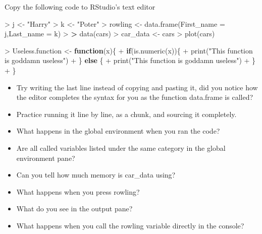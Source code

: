 \documentclass[
]{book}
\newenvironment{Shaded}{\begin{snugshade}}{\end{snugshade}}
\newcommand{\AttributeTok}[1]{\textcolor[rgb]{0.77,0.63,0.00}{#1}}
\newcommand{\ControlFlowTok}[1]{\textcolor[rgb]{0.13,0.29,0.53}{\textbf{#1}}}
\newcommand{\ErrorTok}[1]{\textcolor[rgb]{0.64,0.00,0.00}{\textbf{#1}}}
\newcommand{\FunctionTok}[1]{\textcolor[rgb]{0.00,0.00,0.00}{#1}}
\newcommand{\NormalTok}[1]{#1}
\newcommand{\OtherTok}[1]{\textcolor[rgb]{0.56,0.35,0.01}{#1}}
\newcommand{\SpecialCharTok}[1]{\textcolor[rgb]{0.00,0.00,0.00}{#1}}
\newcommand{\StringTok}[1]{\textcolor[rgb]{0.31,0.60,0.02}{#1}}
\theoremstyle{definition}
\theoremstyle{definition}
\theoremstyle{definition}
\theoremstyle{definition}
\theoremstyle{remark}
\begin{document}
Copy the following code to RStudio's text editor

\begin{Shaded}
\begin{Highlighting}[]
\SpecialCharTok{\textgreater{}}\NormalTok{ j }\OtherTok{\textless{}{-}} \StringTok{"Harry"}
\SpecialCharTok{\textgreater{}}\NormalTok{ k }\OtherTok{\textless{}{-}} \StringTok{"Poter"}
\SpecialCharTok{\textgreater{}}\NormalTok{ rowling }\OtherTok{\textless{}{-}} \FunctionTok{data.frame}\NormalTok{(}\AttributeTok{First\_name =}\NormalTok{ j,}\AttributeTok{Last\_name =}\NormalTok{ k)}
\SpecialCharTok{\textgreater{}} 
\ErrorTok{\textgreater{}} \FunctionTok{data}\NormalTok{(cars)}
\SpecialCharTok{\textgreater{}}\NormalTok{ car\_data }\OtherTok{\textless{}{-}}\NormalTok{ cars}
\SpecialCharTok{\textgreater{}} \FunctionTok{plot}\NormalTok{(cars)}
\end{Highlighting}
\end{Shaded}

\begin{Shaded}
\begin{Highlighting}[]
\SpecialCharTok{\textgreater{}}\NormalTok{ Useless.function }\OtherTok{\textless{}{-}} \ControlFlowTok{function}\NormalTok{(x)\{}
\SpecialCharTok{+}   \ControlFlowTok{if}\NormalTok{(}\FunctionTok{is.numeric}\NormalTok{(x))\{}
\SpecialCharTok{+}   \FunctionTok{print}\NormalTok{(}\StringTok{"This function is goddamn useless"}\NormalTok{)}
\SpecialCharTok{+}\NormalTok{   \} }\ControlFlowTok{else}\NormalTok{ \{}
\SpecialCharTok{+}     \FunctionTok{print}\NormalTok{(}\StringTok{"This function is goddamn useless"}\NormalTok{)}
\SpecialCharTok{+}\NormalTok{   \}}
\SpecialCharTok{+}\NormalTok{ \}}
\end{Highlighting}
\end{Shaded}

\begin{itemize}
\item
  Try writing the last line instead of copying and pasting it, did you notice how the editor completes the syntax for
  you as the function data.frame is called?
\item
  Practice running it line by line, as a chunk, and sourcing it completely.
\item
  What happens in the global environment when you ran the code?
\item
  Are all called variables listed under the same category in the global environment pane?
\item
  Can you tell how much memory is car\_data using?
\item
  What happens when you press rowling?
\item
  What do you see in the output pane?
\item
  What happens when you call the rowling variable directly in the console?
\end{itemize}
\end{document}
